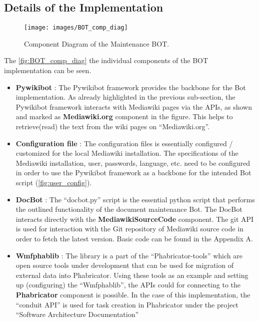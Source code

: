\subsection{Details of the Implementation}

\begin{figure}[H]
  \centering
  \texttt{[image: images/BOT\_comp\_diag]}
  \caption[Component Diagram of the Maintenance BOT]{Component Diagram of the Maintenance BOT.}\label{fig:BOT_comp_diag}
\end{figure}
The \autoref{fig:BOT_comp_diag} the individual components of the BOT implementation can be seen. 
\begin{itemize}
\item \textbf{Pywikibot} : The Pywikibot framework provides the backbone for the Bot implementation. As already highlighted in the previous sub-section, the Pywikibot framework interacts with Mediawiki pages via the APIs, as shown and marked as \textbf{Mediawiki.org} component in the figure. This helps to retrieve(read) the text from the wiki pages on \enquote{Mediawiki.org}.
\item \textbf{Configuration file} : The configuration files is essentially configured / customized for the local Mediawiki installation. The specifications of the Mediawiki installation, user, passwords, language, etc. need to be configured in order to use the Pywikibot framework as a backbone for the intended Bot script (\autoref{fig:user_config}).
\item \textbf{DocBot} : The \enquote{docbot.py} script is the essential python script that performs the outlined functionality of the document maintenance Bot. The DocBot interacts directly with the \textbf{MediawikiSourceCode} component. The git API is used for interaction with the Git repository of Mediawiki source code in order to fetch the latest version. Basic code can be found in the Appendix A.
\item \textbf{Wmfphablib} : The library is a part of the \enquote{Phabricator-tools} which are open source tools under development that can be used for migration of external data into Phabricator\cite{phab-tools}. Using these tools as an example and setting up (configuring) the \enquote{Wmfphablib}, the APIs could for connecting to the \textbf{Phabricator} component is possible. In the case of this implementation, the \enquote{conduit API} is used for task creation in Phabricator under the project \enquote{Software Architecture Documentation}

\end{itemize}

